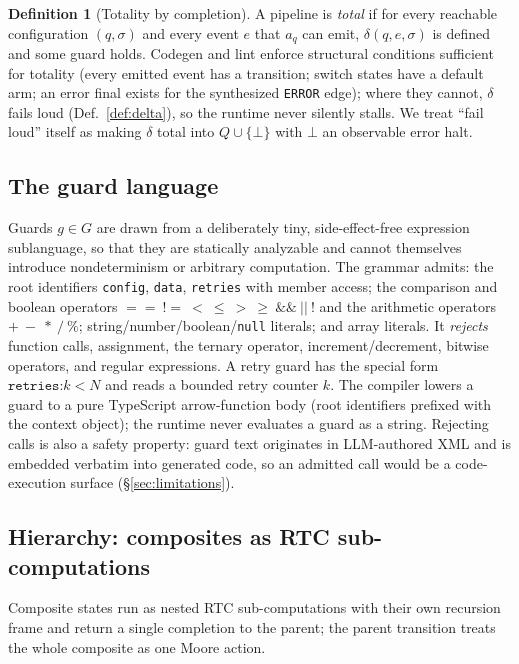 \documentclass[11pt]{article}
\theoremstyle{plain}
\theoremstyle{definition}
\newtheorem{definition}[theorem]{Definition}
\theoremstyle{remark}
\newcommand{\code}[1]{\texttt{#1}}
\newcommand{\state}[1]{\textsf{#1}}
\newcommand{\transition}{\ensuremath{\delta}}
\begin{document}
\begin{definition}[Totality by completion]\label{def:total}
A pipeline is \emph{total} if for every reachable configuration $(q,\sigma)$ and
every event $e$ that $a_q$ can emit, $\transition(q,e,\sigma)$ is defined and some
guard holds. Codegen and lint enforce structural conditions sufficient for
totality (every emitted event has a transition; \state{switch} states have a
default arm; an \state{error} final exists for the synthesized \code{ERROR} edge);
where they cannot, $\transition$ fails loud (Def.~\ref{def:delta}), so the
runtime never silently stalls. We treat ``fail loud'' itself as making $\transition$
total into $Q \cup \{\bot\}$ with $\bot$ an observable error halt.
\end{definition}

\subsection{The guard language}\label{sec:guards}

Guards $g \in G$ are drawn from a deliberately tiny, side-effect-free expression
sublanguage, so that they are statically analyzable and cannot themselves introduce
nondeterminism or arbitrary computation. The grammar admits: the root identifiers
\code{config}, \code{data}, \code{retries} with member access; the comparison and
boolean operators ${==}\ {!=}\ {<}\ {\le}\ {>}\ {\ge}\ \&\&\ \vert\vert\ !$ and the
arithmetic operators ${+}\ {-}\ {*}\ {/}\ \%$; string/number/boolean/\code{null}
literals; and array literals. It \emph{rejects} function calls, assignment, the
ternary operator, increment/decrement, bitwise operators, and regular expressions.
A retry guard has the special form $\code{retries:}k < N$ and reads a bounded retry
counter $k$. The compiler lowers a guard to a pure TypeScript arrow-function body
(root identifiers prefixed with the context object); the runtime never evaluates a
guard as a string. Rejecting calls is also a safety property: guard text originates
in LLM-authored XML and is embedded verbatim into generated code, so an admitted
call would be a code-execution surface (\S\ref{sec:limitations}).

\subsection{Hierarchy: composites as RTC sub-computations}

Composite states run as nested RTC sub-computations with their own recursion frame
and return a single completion to the parent; the parent transition treats the
whole composite as one Moore action.
\end{document}
